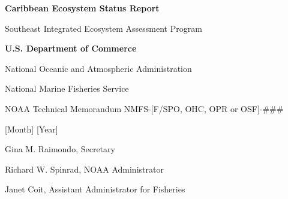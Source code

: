 \begin{titlepage}
    \centering
    {\Large \textbf{Caribbean Ecosystem Status Report} \par}
    \vspace{1.5cm}
    
    {\large Southeast Integrated Ecosystem Assessment Program \par}
    \vspace{5cm}

    {\large \textbf{U.S. Department of Commerce} \par}
    {\large National Oceanic and Atmospheric Administration \par}
    {\large National Marine Fisheries Service \par}
    \vfill

    {\large NOAA Technical Memorandum NMFS-[F/SPO, OHC, OPR or OSF]-### \par}
    \vspace{0.5cm}

    {\large [Month] [Year] \par}
    
    \vfill
    
    {\small Gina M. Raimondo, Secretary \par}
    {\small Richard W. Spinrad, NOAA Administrator \par}
    {\small Janet Coit, Assistant Administrator for Fisheries \par}

    \thispagestyle{empty} %
\end{titlepage}
